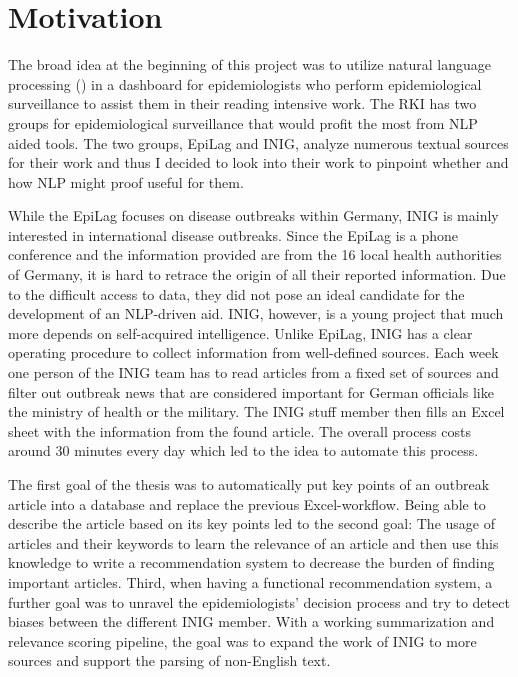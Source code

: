 \section{Motivation}
The broad idea at the beginning of this project was to utilize natural language
processing () in a dashboard for epidemiologists who perform epidemiological
surveillance to assist them in their reading intensive work.
The RKI has two groups for epidemiological surveillance that would profit the most from NLP aided tools. The two groups, EpiLag and INIG, analyze numerous textual sources for their work and thus I decided to look into their work to pinpoint whether and how NLP might proof useful for them.

While the EpiLag focuses on disease outbreaks within Germany, INIG is mainly interested in international disease outbreaks. Since the EpiLag is a phone conference and the information provided are from the 16 local health authorities of Germany, it is hard to retrace the origin of all their reported information.
Due to the difficult access to data, they did not pose an ideal candidate for the development of an NLP-driven aid.
INIG, however, is a young project that much more depends on self-acquired intelligence.
Unlike EpiLag, INIG has a clear operating procedure to collect information from well-defined sources.
Each week one person of the INIG team has to read articles from a fixed set of sources and filter out outbreak news that are considered important for German officials like the ministry of health or the military.
The INIG stuff member then fills an Excel sheet with the information from the found article.
The overall process costs around 30 minutes every day which led to the idea to automate this process.

The first goal of the thesis was to automatically put key points of an outbreak article into a database and replace the previous Excel-workflow. Being able to describe the article based on its key points led to the second goal: The usage of articles and their keywords to learn the relevance of an article and then use this knowledge to write a recommendation system to decrease the burden of finding important articles.
Third, when having a functional recommendation system, a further goal was to unravel the epidemiologists' decision process and try to detect biases between the different INIG member.
With a working summarization and relevance scoring pipeline, the goal was to expand the work of INIG to more sources and support the parsing of non-English text.

